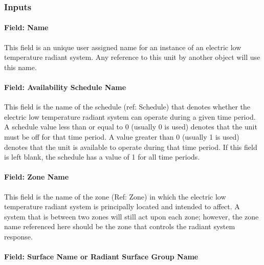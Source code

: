\subsubsection{Inputs}\label{inputs-7-019}

\paragraph{Field: Name}\label{field-name-7-015}

This field is an unique user assigned name for an instance of an electric low temperature radiant system. Any reference to this unit by another object will use this name.

\paragraph{Field: Availability Schedule Name}\label{field-availability-schedule-name-7-003}

This field is the name of the schedule (ref: Schedule) that denotes whether the electric low temperature radiant system can operate during a given time period. A schedule value less than or equal to 0 (usually 0 is used) denotes that the unit must be off for that time period. A value greater than 0 (usually 1 is used) denotes that the unit is available to operate during that time period. If this field is left blank, the schedule has a value of 1 for all time periods.

\paragraph{Field: Zone Name}\label{field-zone-name-2-005}

This field is the name of the zone (Ref: Zone) in which the electric low temperature radiant system is principally located and intended to affect. A system that is between two zones will still act upon each zone; however, the zone name referenced here should be the zone that controls the radiant system response.

\paragraph{Field: Surface Name or Radiant Surface Group Name}\label{field-surface-name-or-radiant-surface-group-name-2}

